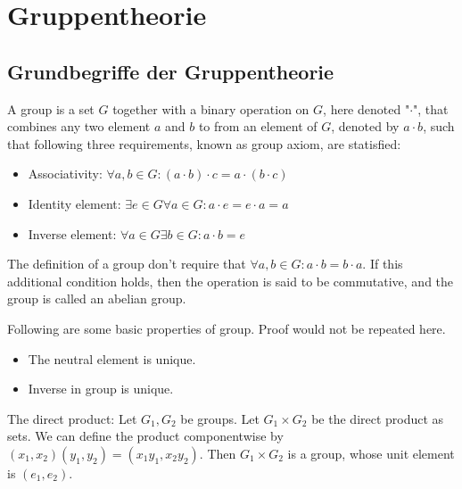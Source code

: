 
\section{Gruppentheorie}
\subsection{Grundbegriffe der Gruppentheorie}


\begin{definition}[Gruppe]
    A group is a set $G$ together with a binary operation on $G$, here denoted "$\cdot$", that combines any two element $a$ and $b$ to from an element of $G$, denoted by $a\cdot b $, such that following three requirements, known as group axiom, are statisfied:\begin{itemize}
        \item Associativity: $\forall a,b \in G: (a\cdot b )\cdot c = a \cdot(b\cdot c)$
        \item Identity element: $\exists e \in G \forall a \in G : a\cdot e = e \cdot a = a$
        \item Inverse element: $\forall a \in G\exists b \in G : a \cdot b = e$
    \end{itemize}
\end{definition}
\begin{remark}
    The definition of a group don't require that $\forall a,b\in G: a \cdot b = b \cdot a$. If this additional condition holds, then the operation is said to be commutative, and the group is called an abelian group.
   
\end{remark}

Following are some basic properties of group. Proof would not be repeated here.

\begin{proposition}
    \begin{itemize}
        \item The neutral element is unique.
        \item Inverse in group is unique.
    \end{itemize}
\end{proposition}

\begin{example}
    The direct product:    Let $G_1,G_2$ be groups. Let $ G_1\times G_2$ be the direct product as sets. We can define the product componentwise by $(x_1, x_2)(y_1,y_2) = (x_1y_1,x_2y_2)$. Then $G_1 \times G_2$ is a group, whose unit element is $(e_1,e_2)$.
\end{example}

